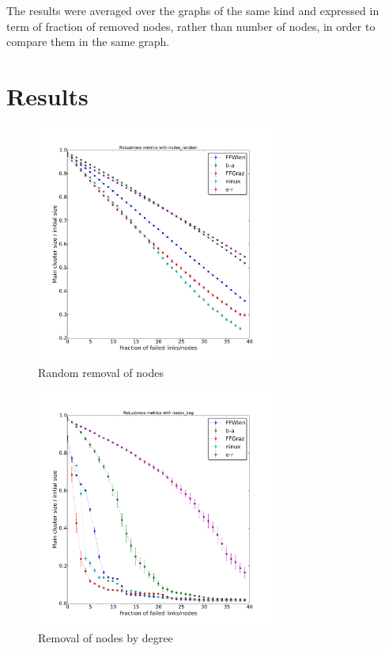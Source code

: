 \documentclass[a4paper,11pt,twoside,openright]{memoir}
\begin{document}
The results were averaged over the graphs of the same kind and expressed
in term of fraction of removed nodes, rather than number of nodes, in
order to compare them in the same graph.

\section{Results}\label{results}

\begin{figure}[htbp]
\centering
\includegraphics[width=0.7\textwidth]{graphs/nodes_random_robustness}
\caption{Random removal of nodes}
\label{fig:node_rand}
\end{figure}

\begin{figure}[htbp]
\centering
\includegraphics[width=0.7\textwidth]{graphs/nodes_deg_robustness}
\caption{Removal of nodes by degree}
\label{fig:node_deg}
\end{figure}
\end{document}
